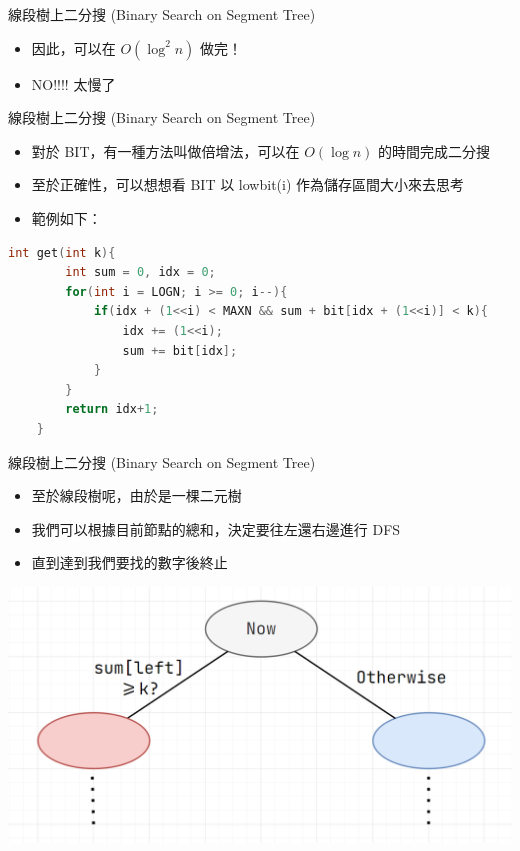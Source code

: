 \documentclass[aspectratio=169]{beamer}
\begin{document}
    \begin{frame}[fragile]{線段樹上二分搜 (Binary Search on Segment Tree)}
        \begin{itemize}
            \item 因此，可以在 $O(\log^2 n)$ 做完！
            \item<2-> NO!!!! 太慢了
        \end{itemize}
    \end{frame}

    \begin{frame}[fragile]{線段樹上二分搜 (Binary Search on Segment Tree)}
        \begin{itemize}
            \item 對於 BIT，有一種方法叫做倍增法，可以在 $O(\log n)$ 的時間完成二分搜
            \item 至於正確性，可以想想看 BIT 以 lowbit(i) 作為儲存區間大小來去思考
            \item 範例如下：
        \end{itemize}
        \begin{lstlisting}[language=C++, basicstyle=\ttfamily\small]
    int get(int k){
        int sum = 0, idx = 0;
        for(int i = LOGN; i >= 0; i--){
            if(idx + (1<<i) < MAXN && sum + bit[idx + (1<<i)] < k){
                idx += (1<<i);
                sum += bit[idx];
            }
        }
        return idx+1;
    }
        \end{lstlisting}
    \end{frame}

    \begin{frame}[fragile]{線段樹上二分搜 (Binary Search on Segment Tree)}
        \begin{itemize}
            \item 至於線段樹呢，由於是一棵二元樹
            \item 我們可以根據目前節點的總和，決定要往左還右邊進行 DFS
            \item 直到達到我們要找的數字後終止
        \end{itemize}
        \begin{center}
            \includegraphics[scale=0.2]{binary_search_on_segment_tree/binary_search_on_segment_tree.png}
        \end{center}
    \end{frame}
\end{document}
